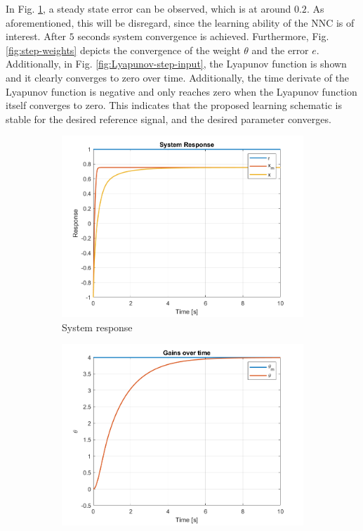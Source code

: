 In Fig. \ref{fig:step}, a steady state error can be observed, which is at around $0.2$. As aforementioned, this will be disregard, since the learning ability of the NNC is of interest. After $5$ seconds system convergence is achieved. Furthermore, Fig. \ref{fig:step-weights} depicts the convergence of the weight $\theta$ and the error $e$. Additionally, in Fig. \ref{fig:Lyapunov-step-input}, the Lyapunov function is shown and it clearly converges to zero over time. Additionally, the time derivate of the Lyapunov function is negative and only reaches zero when the Lyapunov function itself converges to zero. This indicates that the proposed learning schematic is stable for the desired reference signal, and the desired parameter converges.

\begin{figure}[!t]
    \centering
    \begin{subfigure}[b]{0.49\linewidth}
        \centering
        \includegraphics[width=\linewidth]{images/NL-MRAC-SIM/Step/v2/NMRAC_First-Order_Response.png}
        \caption{System response}
        \label{fig:step}
    \end{subfigure}
    \hfill
    \begin{subfigure}[b]{0.49\linewidth}
        \centering
        \includegraphics[width=\linewidth]{images/NL-MRAC-SIM/Step/v2/NMRAC_First-Order_Parameters.png}

\end{subfigure}
\end{figure}
